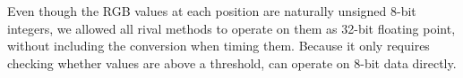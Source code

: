 Even though the RGB values at each position are naturally unsigned 8-bit integers, we allowed all rival methods to operate on them as 32-bit floating point, without including the conversion when timing them. Because it only requires checking whether values are above a threshold, \oursp can operate on 8-bit data directly.
